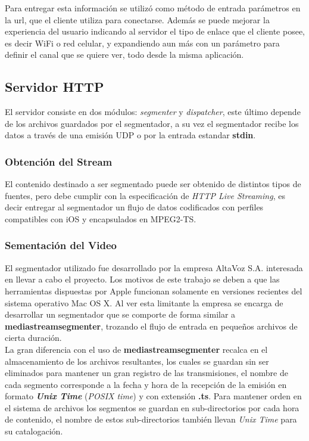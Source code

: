 	Para entregar esta información se utilizó como método de entrada parámetros en la url, que el cliente utiliza para conectarse. Además se puede mejorar la experiencia del usuario indicando al servidor el tipo de enlace que el cliente posee, es decir WiFi o red celular, y expandiendo aun más con un parámetro para definir el canal que se quiere ver, todo desde la misma aplicación.
	
	\subsection{Servidor HTTP}
	El servidor consiste en dos módulos: \textit{segmenter} y \textit{dispatcher}, este último depende de los archivos guardados por el segmentador, a su vez el segmentador recibe los datos a través de una emisión UDP o por la entrada estandar \textbf{stdin}.
		\subsubsection{Obtención del Stream}
El contenido destinado a ser segmentado puede ser obtenido de distintos tipos de fuentes, pero debe cumplir con la especificación de \textit{HTTP Live Streaming}, es decir entregar al segmentador un flujo de datos codificados con perfiles compatibles con iOS y encapsulados en MPEG2-TS.
		\subsubsection{Sementación del Video}

El segmentador utilizado fue desarrollado por la empresa AltaVoz S.A. interesada en llevar a cabo el proyecto. Los motivos de este trabajo se deben a que las herramientas dispuestas por Apple funcionan solamente en versiones recientes del sistema operativo Mac OS X. Al ver esta limitante la empresa se encarga de desarrollar un segmentador que se comporte de forma similar a \textbf{mediastreamsegmenter}, trozando el flujo de entrada en pequeños archivos de cierta duración.\\

 La gran diferencia con el uso de \textbf{mediastreamsegmenter} recalca en el almacenamiento de los archivos resultantes, los cuales se guardan sin ser eliminados para mantener un gran registro de las transmisiones, el nombre de cada segmento corresponde a la fecha y hora de la recepción de la emisión en formato \textit{\textbf{Unix Time}} (\textit{POSIX time}) y con extensión \textbf{.ts}. Para mantener orden en el sistema de archivos los segmentos se guardan en sub-directorios por cada hora de contenido, el nombre de estos sub-directorios también llevan \textit{Unix Time} para su catalogación.\\

